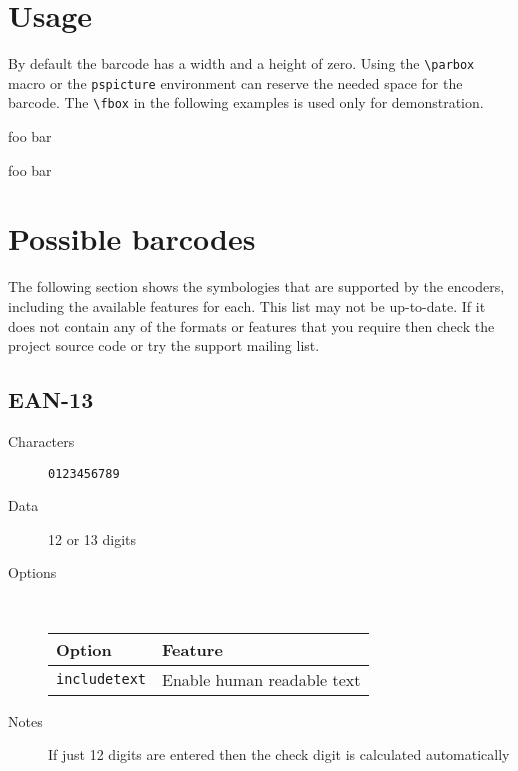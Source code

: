 \documentclass{article}
\def\CMD#1{\texttt{\textbackslash #1}}
\begin{document}
\section{Usage}
By default the barcode has a width and a height of zero. Using the \CMD{parbox}
macro or the \verb+pspicture+ environment can reserve the needed space for
the barcode. The \CMD{fbox} in the following examples is used
only for demonstration.


\begin{LTXexample}[width=.5\linewidth]
foo
bar
\end{LTXexample}

\bigskip
\begin{LTXexample}[width=.5\linewidth]
foo
bar
\end{LTXexample}


\section{Possible barcodes}

The following section shows the symbologies that are supported by
the encoders, including the available features for each. This list
may not be up-to-date. If it does not contain any of the formats or
features that you require then check the project source code or
try the support mailing list.

\subsection{EAN-13}

\begin{description}
\item[Characters] \verb+0123456789+
\item[Data]  12 or 13 digits
\item[Options]~\\
  \begin{tabular}{l|l}
  Option                   & Feature\\\hline
  \texttt{includetext}     & Enable human readable text\\
  \end{tabular}
\item[Notes] If just 12 digits are entered then the check digit is calculated automatically  
\end{description}
\end{document}
